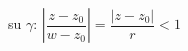 \documentclass[preview]{standalone}
\begin{document}
\begin{center}
su $\gamma$: $\left|\dfrac{z-z_0}{w-z_0}\right| = \dfrac{|z-z_0|}{r} < 1$
\end{center}
\end{document}
